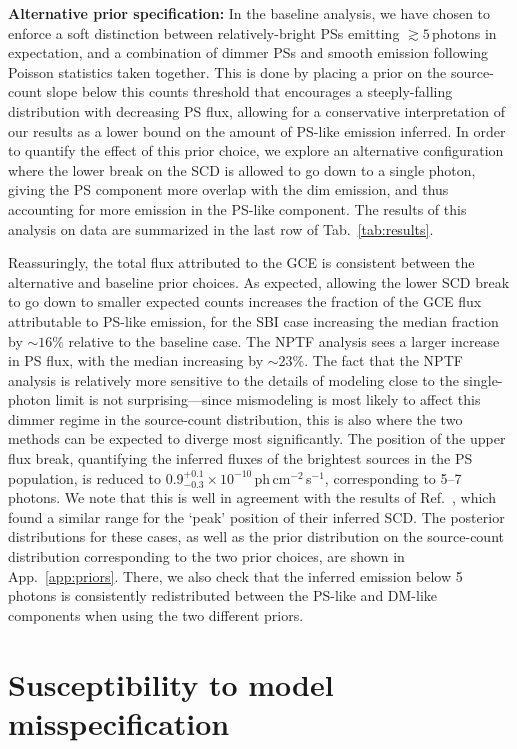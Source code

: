\documentclass[prd,aps,10pt,nofootinbib,twocolumn,superscriptaddress,preprintnumbers,balancelastpage,longbibliography,floatfix]{revtex4-2}
\begin{document}
\noindent
\textbf{Alternative prior specification:}
In the baseline analysis, we have chosen to enforce a soft distinction between relatively-bright PSs emitting $\gtrsim 5$\,photons in expectation, and a combination of dimmer PSs and smooth emission following Poisson statistics taken together. This is done by placing a prior on the source-count slope below this counts threshold that encourages a steeply-falling distribution with decreasing PS flux, allowing for a conservative interpretation of our results as a lower bound on the amount of PS-like emission inferred. In order to quantify the effect of this prior choice, we explore an alternative configuration where the lower break on the SCD is allowed to go down to a single photon, giving the PS component more overlap with the dim emission, and thus accounting for more emission in the PS-like component. The results of this analysis on data are summarized in the last row of Tab.~\ref{tab:results}.

Reassuringly, the total flux attributed to the GCE is consistent between the alternative and baseline prior choices. As expected, allowing the lower SCD break to go down to smaller expected counts increases the fraction of the GCE flux attributable to PS-like emission, for the SBI case increasing the median fraction by $\sim16\%$ relative to the baseline case. The NPTF analysis sees a larger increase in PS flux, with the median increasing by $\sim23\%$. The fact that the NPTF analysis is relatively more sensitive to the details of modeling close to the single-photon limit is not surprising---since mismodeling is most likely to affect this dimmer regime in the source-count distribution, this is also where the two methods can be expected to diverge most significantly. 
The position of the upper flux break, quantifying the inferred fluxes of the brightest sources in the PS population, is reduced to $0.9^{+0.1}_{-0.3}\times 10^{-10}$\,ph\,cm$^{-2}$\,s$^{-1}$, corresponding to 5--7\,photons. We note that this is well in agreement with the results of Ref.~\cite{List:2021aer}, which found a similar range for the `peak' position of their inferred SCD.
The posterior distributions for these cases, as well as the prior distribution on the source-count distribution corresponding to the two prior choices, are shown in App.~\ref{app:priors}. There, we also check that the inferred emission below 5 photons is consistently redistributed between the PS-like and DM-like components when using the two different priors.

\section{Susceptibility to model misspecification}
\label{sec:mismodeling}
\end{document}
